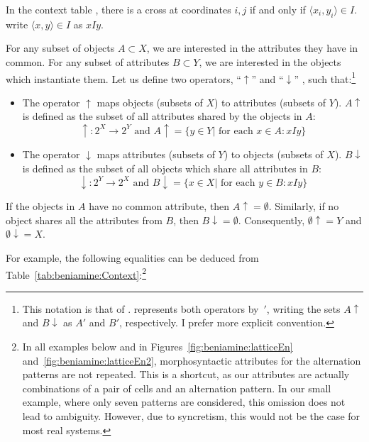 \documentclass[output=paper]{langscibook}
\begin{document}
    In the context table \context{}, there is a cross at coordinates $i,j$ if and only if $\langle x_{i}, y_{i}\rangle \in I$. \citet{GanterWille1998} write $\langle x,y \rangle \in I$ as $xIy$.

    For any subset of objects $A \subset X$, we are interested in the attributes they have in common. For any subset of attributes  $B \subset Y$, we are interested in the objects which instantiate them. Let us define two operators, ``$\uparrow$'' and ``$\downarrow$'' \citep[6--7]{Belohlavek2009}, such that:\footnote{This notation is that of \citet{Belohlavek2009}. \citet{GanterWille1998} represents both operators by~\mbox{$'$,} writing the sets $A\uparrow$ and $B\downarrow$ as $A'$ and $B'$, respectively. I prefer  more explicit convention.}

    \begin{itemize}
        \item The operator $\uparrow$ maps objects (subsets of $X$) to attributes (subsets of $Y$). $A\uparrow$ is defined as the subset of all attributes shared by the objects in $A$:\\
        $$\uparrow:2^{X} \to 2^{Y} \mbox{ and } A\uparrow = \{y \in Y | \mbox{ for each } x \in A : xIy\}$$
        \item The operator $\downarrow$ maps attributes (subsets of $Y$) to  objects (subsets of $X$). $B\downarrow$ is defined as the subset of all objects which share all attributes in $B$:\\
        $$\downarrow:2^{Y} \to 2^{X} \mbox{ and } B\downarrow = \{x \in X | \mbox{ for each } y \in B :  xIy\}$$
    \end{itemize}

    If the objects in $A$ have no common attribute, then $A\uparrow = \emptyset$. Similarly, if no object shares all the attributes from $B$, then $B\downarrow = \emptyset$. Consequently, $\emptyset\uparrow = Y$ and $\emptyset\downarrow = X$.

    For example, the following equalities can be deduced from Table~\ref{tab:beniamine:Context}:\footnote{In all examples below and in Figures~\ref{fig:beniamine:latticeEn} and~\ref{fig:beniamine:latticeEn2}, morphosyntactic attributes for the alternation patterns are not repeated. This is a shortcut, as our attributes are actually combinations of a pair of cells and an alternation pattern. In our small example, where only seven patterns are considered, this omission  does not lead to ambiguity. However, due to syncretism, this would not be the case for most real systems.}
\end{document}
